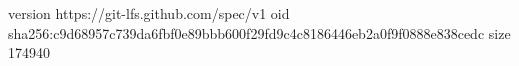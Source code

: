 version https://git-lfs.github.com/spec/v1
oid sha256:c9d68957c739da6fbf0e89bbb600f29fd9c4c8186446eb2a0f9f0888e838cedc
size 174940
